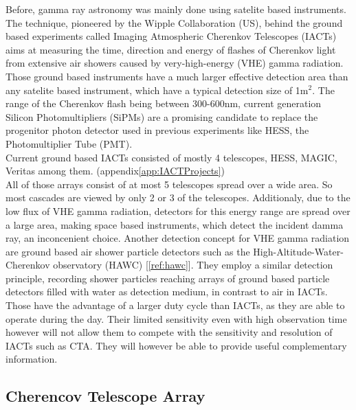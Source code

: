 \documentclass[12pt,article,type=msc,colorback,accentcolor=tud9c]{tudthesis}
\begin{document}
Before, gamma ray astronomy was mainly done using satelite based instruments. The technique, pioneered by the Wipple Collaboration (US), behind the ground based experiments called Imaging Atmospheric Cherenkov Telescopes (IACTs) aims at measuring the time, direction and energy of flashes of Cherenkov light from extensive air showers caused by very-high-energy (VHE) gamma radiation. Those ground based instruments have a much larger effective detection area than any satelite based instrument, which have a typical detection size of 1m$^2$. The range of the Cherenkov flash being between 300-600nm, current generation Silicon Photomultipliers (SiPMs) are a promising candidate to replace the progenitor photon detector used in previous experiments like HESS, the Photomultiplier Tube (PMT).\\
Current ground based IACTs consisted of mostly 4 telescopes,  HESS, MAGIC, Veritas among them. (appendix{\ref{app:IACTProjects}})\\
All of those arrays consist of at most 5 telescopes spread over a wide area. So most cascades are viewed by only 2 or 3 of the telescopes. Additionaly, due to the low flux of VHE gamma radiation, detectors for this energy range are spread over a large area, making space based instruments, which detect the incident damma ray, an inconcenient choice. Another detection concept for VHE gamma radiation are ground based air shower particle detectors such as the High-Altitude-Water-Cherenkov observatory (HAWC) [\ref{ref:hawc}]. They employ a similar detection principle, recording shower particles reaching arrays of ground based particle detectors filled with water as detection medium, in contrast to air in IACTs. Those have the advantage of a larger duty cycle than IACTs, as they are able to operate during the day. Their limited sensitivity even with high observation time however will not allow them to compete with the sensitivity and resolution of IACTs such as CTA. They will however be able to provide useful complementary information. 

\subsection{Cherencov Telescope Array}
\end{document}
